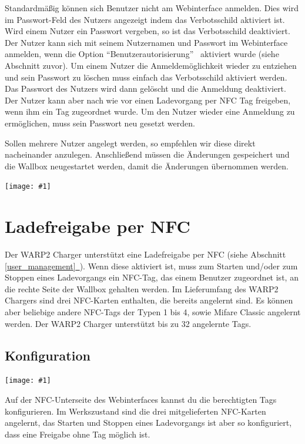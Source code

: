 \documentclass[a4paper,10pt]{article}
\newcommand{\gfx}[1]{\texttt{[image: \#1]}}
\newcommand*{\fullref}[1]{Abschnitt \hyperref[{#1}]{\ref*{#1}~\nameref*{#1}}}
\begin{document}
\begin{multicols*}{2}
    Standardmäßig können sich Benutzer nicht am Webinterface anmelden. Dies wird
    im Passwort-Feld des Nutzers angezeigt indem das Verbotsschild aktiviert
    ist. Wird einem Nutzer ein Passwort vergeben, so ist das Verbotsschild
    deaktiviert. Der Nutzer kann sich mit seinem Nutzernamen und Passwort im
    Webinterface anmelden, wenn die Option \enquote{Benutzerautorisierung}
    ~aktiviert wurde (siehe Abschnitt zuvor).
    Um einem Nutzer die Anmeldemöglichkeit wieder zu entziehen und sein Passwort
    zu löschen muss einfach das Verbotsschild aktiviert werden. Das Passwort des
    Nutzers wird dann gelöscht und die Anmeldung deaktiviert. Der Nutzer kann
    aber nach wie vor einen Ladevorgang per NFC Tag freigeben, wenn ihm ein Tag
    zugeordnet wurde. Um den Nutzer wieder eine Anmeldung zu ermöglichen, muss
    sein Passwort neu gesetzt werden.

    Sollen mehrere Nutzer angelegt werden, so empfehlen wir diese direkt
    nacheinander anzulegen. Anschließend müssen die Änderungen gespeichert und
    die Wallbox neugestartet werden, damit die Änderungen übernommen werden.

    \gfx{./img_warp2/resized/web_users}

    \newpage
    \section{Ladefreigabe per NFC}
    \label{NFC}
    Der WARP2 Charger unterstützt eine Ladefreigabe per NFC (siehe \fullref{user_management}).
    Wenn diese aktiviert ist,
    muss zum Starten und/oder zum Stoppen eines Ladevorgangs ein NFC-Tag, das einem Benutzer zugeordnet ist, an die rechte Seite
    der Wallbox gehalten werden. Im Lieferumfang des WARP2 Chargers sind drei NFC-Karten enthalten,
    die bereits angelernt sind. Es können aber beliebige andere NFC-Tags der Typen 1 bis 4,
    sowie Mifare Classic angelernt werden. Der WARP2 Charger unterstützt bis zu 32 angelernte Tags.

    \subsection{Konfiguration}
    \gfx{./img_warp2/resized/web_nfc}

    Auf der NFC-Unterseite des Webinterfaces kannst du die berechtigten Tags konfigurieren.
    Im Werkszustand sind die drei mitgelieferten NFC-Karten angelernt,
    das Starten und Stoppen eines Ladevorgangs ist aber so konfiguriert, dass eine
    Freigabe ohne Tag möglich ist.


\end{multicols*}
\end{document}
